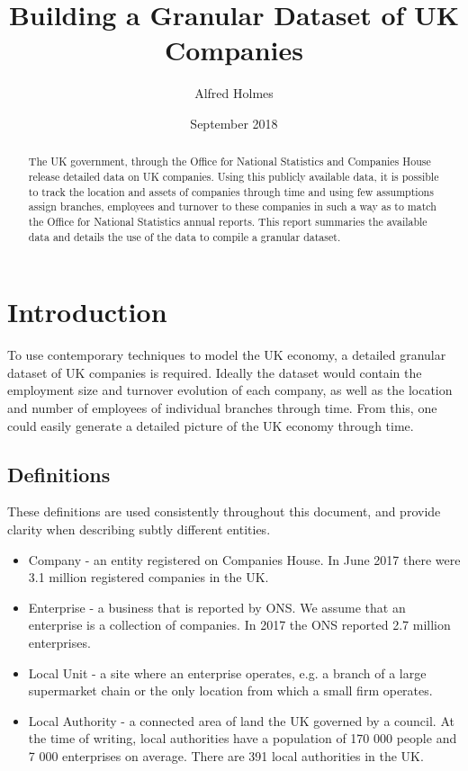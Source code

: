 \documentclass[a4paper,10pt]{article}
\title{Building a Granular Dataset of UK Companies}
\author{Alfred Holmes}
\date{September 2018}
\begin{document}
   \maketitle
   \begin{abstract}
   The UK government, through the Office for National Statistics and Companies House release detailed data on UK companies. Using this publicly available data, it is possible to track the location and assets of companies through time and using few assumptions assign branches, employees and turnover to these companies in such a way as to match the Office for National Statistics annual reports. This report summaries the available data and details the use of the data to compile a granular dataset.
   \end{abstract}
   \section{Introduction}
   To use contemporary techniques to model the UK economy, a detailed granular dataset of UK companies is required. Ideally the dataset would contain the employment size and turnover evolution of each company, as well as the location and number of employees of individual branches through time. From this, one could easily generate a detailed picture of the UK economy through time.
   \subsection{Definitions}
   These definitions are used consistently throughout this document, and provide clarity when describing subtly different entities.
   \begin{itemize}
 	\item Company - an entity registered on Companies House. In June 2017 there were 3.1 million registered companies in the UK. 
 	\item Enterprise - a business that is reported by ONS. We assume that an enterprise is a collection of companies. In 2017 the ONS reported 2.7 million enterprises.
 	\item Local Unit - a site where an enterprise operates, e.g. a branch of a large supermarket chain or the only location from which a small firm operates.
 	\item Local Authority - a connected area of land the UK governed by a council. At the time of writing, local authorities have a population of 170 000 people and 7 000 enterprises on average. There are 391 local authorities in the UK.
   \end{itemize}
\end{document}
